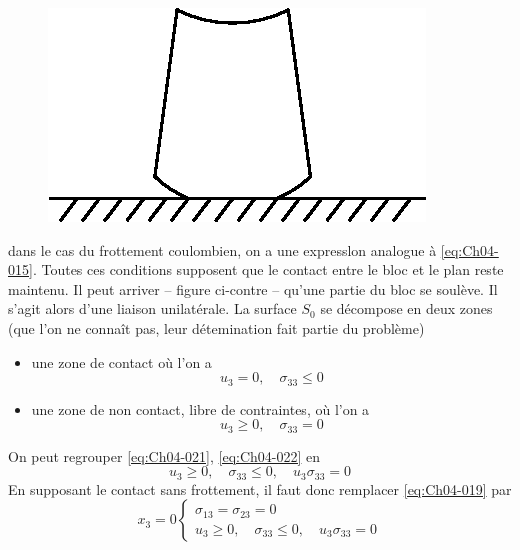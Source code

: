 \begin{figure}
    \begin{center}
        \includegraphics{../images/T1_Ch04-0005}
    \end{center}
\end{figure}
dans le cas du frottement coulombien, on a une expresslon analogue à \eqref{eq:Ch04-015}.
Toutes ces conditions supposent que le contact entre le bloc et le plan reste maintenu.
Il peut arriver -- figure ci-contre -- qu'une partie du bloc se soulève.
Il s'agit alors d'une liaison unilatérale.
La surface $S_0$ se décompose en deux zones (que l'on ne connaît pas, leur détemination fait partie du problème)
\begin{itemize}
    \item une zone de contact où l'on a
        \begin{equation}
            u_3 = 0, \quad \sigma_{33} \leq 0
            \label{eq:Ch04-021}
        \end{equation}
    \item une zone de non contact, libre de contraintes, où l'on a
        \begin{equation}
            u_3 \geq 0, \quad \sigma_{33} = 0
            \label{eq:Ch04-022}
        \end{equation}
\end{itemize}
On peut regrouper \eqref{eq:Ch04-021}, \eqref{eq:Ch04-022} en
\begin{equation}
    u_3 \geq 0, \quad \sigma_{33} \leq 0, \quad u_3 \sigma_{33} = 0
    \label{eq:Ch04-023}
\end{equation}
En supposant le contact sans frottement, il faut donc remplacer \eqref{eq:Ch04-019} par
\begin{equation}
    x_3 = 0 
    \begin{cases}
        \sigma_{13} = \sigma_{23} = 0 \\
        u_3 \geq 0, \quad \sigma_{33} \leq 0, \quad u_3 \sigma_{33} = 0
    \end{cases}
    \label{eq:Ch04-024}
\end{equation}

